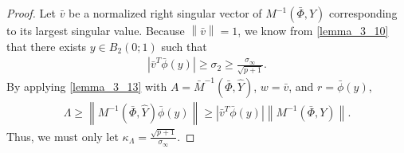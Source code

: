 \begin{proof}
Let $\bar v$ be a normalized right singular vector of $M^{-1}\left(\bar \Phi, Y\right)$ corresponding to its largest singular value.
Because $\left\|\bar v\right\| = 1$, we know from \cref{lemma_3_10} that there exists $y \in B_2\left(0; 1\right)$ such that
\begin{align*}
\left| {\bar v}^T \bar {\phi}(y) \right| \ge \sigma_2 \ge \frac {\sigma_{\infty}}{\sqrt{p+1}}.
\end{align*}
By applying \cref{lemma_3_13} with $A={\bar M}^{-1}\left(\bar \Phi, \hat Y\right)$, $w = \bar v$, and $r = \bar \phi(y)$,
\begin{align*}
\Lambda \ge \left\|M^{-1}\left(\bar \Phi, \hat Y\right) \bar{\phi}(y)\right\| \ge |\bar v^T \bar \phi(y)| \left\|M^{-1}\left(\bar \Phi, Y\right)\right\|.
\end{align*}
Thus, we must only let $\kappa_{\Lambda} = \frac {\sqrt{p+1}}{\sigma_{\infty}}$.

\end{proof}


